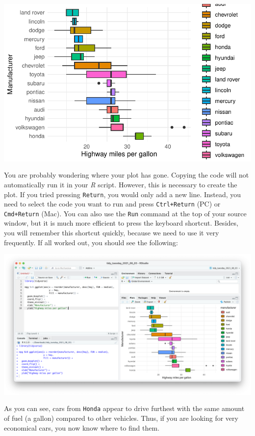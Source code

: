 \documentclass[
  letterpaper,
  DIV=11,
  numbers=noendperiod]{scrreprt}
\begin{document}
\includegraphics{06_starting_r_projects_files/figure-latex/r-script-copy-paste-examples-1.pdf}

You are probably wondering where your plot has gone. Copying the code
will not automatically run it in your \emph{R} script. However, this is
necessary to create the plot. If you tried pressing \texttt{Return}, you
would only add a new line. Instead, you need to select the code you want
to run and press \texttt{Ctrl+Return} (PC) or \texttt{Cmd+Return} (Mac).
You can also use the \texttt{Run} command at the top of your source
window, but it is much more efficient to press the keyboard shortcut.
Besides, you will remember this shortcut quickly, because we need to use
it very frequently. If all worked out, you should see the following:

\includegraphics{images/chapter_06_img/02_r_script/01_r_script_example_plot.png}

As you can see, cars from \texttt{Honda} appear to drive furthest with
the same amount of fuel (a gallon) compared to other vehicles. Thus, if
you are looking for very economical cars, you now know where to find
them.
\end{document}
